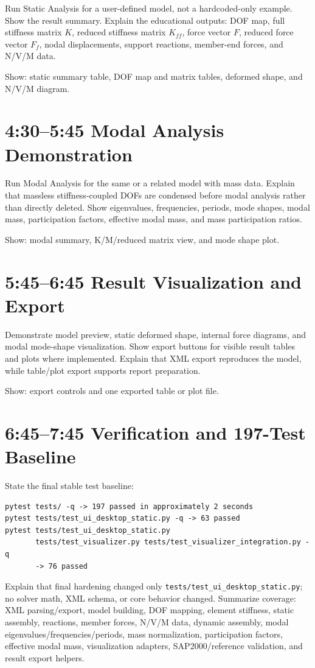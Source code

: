 \documentclass[11pt,a4paper]{article}
\begin{document}
Run Static Analysis for a user-defined model, not a hardcoded-only example. Show the result summary. Explain the educational outputs: DOF map, full stiffness matrix \(K\), reduced stiffness matrix \(K_{ff}\), force vector \(F\), reduced force vector \(F_f\), nodal displacements, support reactions, member-end forces, and N/V/M data.

Show: static summary table, DOF map and matrix tables, deformed shape, and N/V/M diagram.

\section{4:30--5:45 Modal Analysis Demonstration}

Run Modal Analysis for the same or a related model with mass data. Explain that massless stiffness-coupled DOFs are condensed before modal analysis rather than directly deleted. Show eigenvalues, frequencies, periods, mode shapes, modal mass, participation factors, effective modal mass, and mass participation ratios.

Show: modal summary, K/M/reduced matrix view, and mode shape plot.

\section{5:45--6:45 Result Visualization and Export}

Demonstrate model preview, static deformed shape, internal force diagrams, and modal mode-shape visualization. Show export buttons for visible result tables and plots where implemented. Explain that XML export reproduces the model, while table/plot export supports report preparation.

Show: export controls and one exported table or plot file.

\section{6:45--7:45 Verification and 197-Test Baseline}

State the final stable test baseline:
\begin{verbatim}
pytest tests/ -q -> 197 passed in approximately 2 seconds
pytest tests/test_ui_desktop_static.py -q -> 63 passed
pytest tests/test_ui_desktop_static.py
       tests/test_visualizer.py tests/test_visualizer_integration.py -q
       -> 76 passed
\end{verbatim}

Explain that final hardening changed only \texttt{tests/test\_ui\_desktop\_static.py}; no solver math, XML schema, or core behavior changed. Summarize coverage: XML parsing/export, model building, DOF mapping, element stiffness, static assembly, reactions, member forces, N/V/M data, dynamic assembly, modal eigenvalues/frequencies/periods, mass normalization, participation factors, effective modal mass, visualization adapters, SAP2000/reference validation, and result export helpers.
\end{document}
